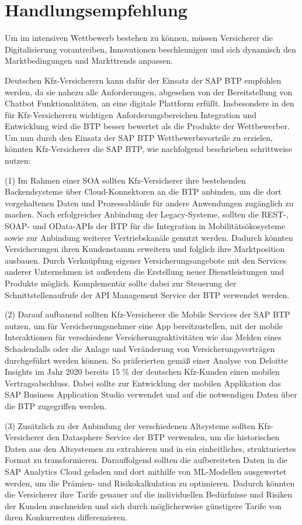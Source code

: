 \chapter{Handlungsempfehlung}

Um im intensiven Wettbewerb bestehen zu können, müssen Versicherer die Digitalisierung  vorantreiben, Innovationen beschleunigen und sich dynamisch den Marktbedingungen und Markttrends anpassen.

Deutschen Kfz-Versicherern kann dafür der Einsatz der SAP BTP empfohlen werden, da sie nahezu alle Anforderungen, abgesehen von der Bereitstellung von Chatbot Funktionalitäten, an eine digitale Plattform erfüllt. Insbesondere in den für Kfz-Versicherern wichtigen Anforderungsbereichen Integration und Entwicklung wird die BTP besser bewertet als die Produkte der Wettbewerber. Um nun durch den Einsatz der SAP BTP Wettbewerbsvorteile zu erzielen, könnten Kfz-Versicherer die SAP BTP, wie nachfolgend beschrieben schrittweise nutzen:

(1) Im Rahmen einer SOA sollten Kfz-Versicherer ihre bestehenden Backendsysteme über Cloud-Konnektoren an die BTP anbinden, um die dort vorgehaltenen Daten und Prozessabläufe für andere Anwendungen zugänglich zu machen. Nach erfolgreicher Anbindung der Legacy-Systeme, sollten die REST-, SOAP- und OData-APIs der BTP für die Integration in Mobilitätsökosysteme sowie zur Anbindung weiterer Vertriebskanäle genutzt werden. Dadurch könnten Versicherungen ihren Kundenstamm erweitern und folglich ihre Marktposition ausbauen. Durch Verknüpfung eigener Versicherungsangebote mit den Services anderer Unternehmen ist außerdem die Erstellung neuer Dienstleistungen und Produkte möglich. Komplementär sollte dabei zur Steuerung der Schnittstellenaufrufe der API Management Service der BTP verwendet werden.

(2) Darauf aufbauend sollten Kfz-Versicherer die Mobile Services der SAP BTP nutzen, um für Versicherungsnehmer eine App bereitzustellen, mit der mobile Interaktionen für verschiedene Versicherungsaktivitäten wie das Melden eines Schadendalls oder die Anlage und Veränderung von Versicherungsverträgen durchgeführt werden können. So präferierten gemäß einer Analyse von Deloitte Insights im Jahr 2020 bereits 15 \% der deutschen Kfz-Kunden einen mobilen Vertragsabschluss.\autocite[Vgl.][S. 15]{BAUMANN2020} Dabei sollte zur Entwicklung der mobilen Applikation das SAP Business Application Studio verwendet und auf die notwendigen Daten über die BTP zugegriffen werden. 

(3) Zusätzlich zu der Anbindung der verschiedenen Altsysteme sollten Kfz-Versicherer den Datasphere Service der BTP verwenden, um die historischen Daten aus den Altsystemen zu extrahieren und in ein einheitliches, strukturiertes Format zu transformieren. Darauffolgend sollten die aufbereiteten Daten in die SAP Analytics Cloud geladen und dort mithilfe von ML-Modellen ausgewertet werden, um die Prämien- und Risikokalkulation zu optimieren. Dadurch könnten die Versicherer ihre Tarife genauer auf die individuellen Bedürfnisse und Risiken der Kunden zuschneiden und sich durch möglicherweise günstigere Tarife von ihren Konkurrenten differenzieren.

